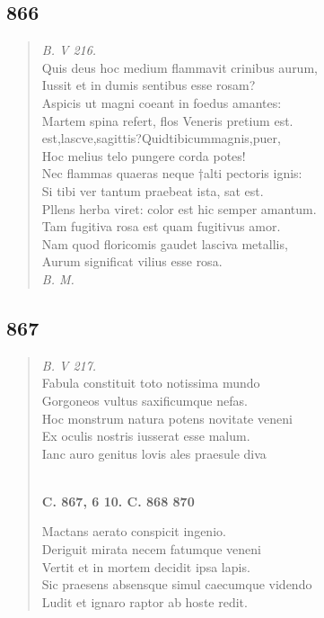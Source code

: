 \documentclass[11pt, a4paper]{report}
\begin{document}
            \subsection*{866}
      \begin{verse}
      \textit{B. V 216.} \\ Quis deus hoc medium flammavit crinibus aurum, \\ Iussit et in dumis sentibus esse rosam? \\ Aspicis ut magni coeant in foedus amantes: \\ Martem spina refert, flos Veneris pretium est. \\ est,lascve,sagittis?Quidtibicummagnis,puer, \\ Hoc melius telo pungere corda potes! \\ Nec flammas quaeras neque †alti pectoris ignis: \\ Si tibi ver tantum praebeat ista, sat est. \\ Pllens herba viret: color est hic semper amantum. \\ Tam fugitiva rosa est quam fugitivus amor. \\ Nam quod floricomis gaudet lasciva metallis, \\ Aurum significat vilius esse rosa. \\ \textit{B. M.} \\ 
      \end{verse}
  
            \subsection*{867}
      \begin{verse}
      \textit{B. V 217.} \\ Fabula constituit toto notissima mundo \\ Gorgoneos vultus saxificumque nefas. \\ Hoc monstrum natura potens novitate veneni \\ Ex oculis nostris iusserat esse malum. \\ Ianc auro genitus lovis ales praesule diva \\ 
        ﻿\pagebreak 
    \begin{center} \textbf{C. 867, 6 10. C. 868 870} \end{center} \marginpar{[317]} Mactans aerato conspicit ingenio. \\ Deriguit mirata necem fatumque veneni \\ Vertit et in mortem decidit ipsa lapis. \\ Sic praesens absensque simul caecumque videndo \\ Ludit et ignaro raptor ab hoste redit. \\ 
      \end{verse}
  
\end{document}
